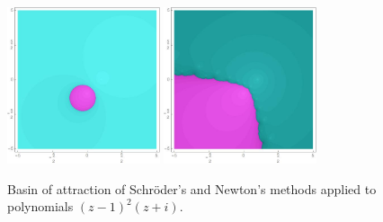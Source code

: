 \documentclass[10pt,a4paper]{article}
\newcommand{\twofractals}[4]{%
\begin{center}
\begin{minipage}[t]{0.45\textwidth}
\begin{centering}
\texttt{[image: \#1]}%
\end{centering}
\centering{\small  #2}
\end{minipage}\hfill%
\begin{minipage}[t]{0.45\textwidth}
\begin{centering}
\texttt{[image: \#3]}%
\end{centering}
\centering{\small #4}
\end{minipage}\hfill%
\end{center}%
}
\begin{document}
\begin{figure}[H]
\centering 
\includegraphics[width=0.4\textwidth]{imagenes/sch-i_m2_n1.jpg}\quad 
\includegraphics[width=0.4\textwidth]{imagenes/newton1-i_m2_n1.jpg}


\caption{Basin of attraction of Schr\"oder's and Newton's methods applied to polynomials $(z-1)^2(z+i)$.}
\label{fig4}
\end{figure}  
\newpage
\end{document}
